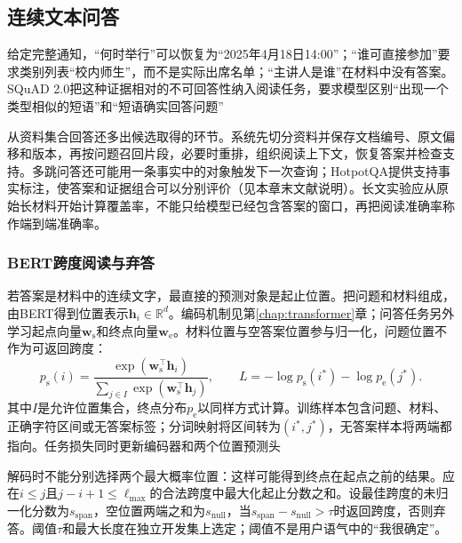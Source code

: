 \subsection{连续文本问答}
\label{sec:nlp-dialogue-text-qa}

给定完整通知，“何时举行”可以恢复为“2025年4月18日14:00”；“谁可直接参加”要求类别列表“校内师生”，而不是实际出席名单；“主讲人是谁”在材料中没有答案。SQuAD 2.0把这种证据相对的不可回答性纳入阅读任务，要求模型区别“出现一个类型相似的短语”和“短语确实回答问题”

从资料集合回答还多出候选取得的环节。系统先切分资料并保存文档编号、原文偏移和版本，再按问题召回片段，必要时重排，组织阅读上下文，恢复答案并检查支持。多跳问答还可能用一条事实中的对象触发下一次查询；HotpotQA提供支持事实标注，使答案和证据组合可以分别评价（见本章末文献说明）。长文实验应从原始长材料开始计算覆盖率，不能只给模型已经包含答案的窗口，再把阅读准确率称作端到端准确率。

\subsubsection{BERT跨度阅读与弃答}
\label{sec:nlp-dialogue-bert-span}

若答案是材料中的连续文字，最直接的预测对象是起止位置。把问题和材料组成，由BERT得到位置表示$\bm{h}_i\in\mathbb{R}^{d}$。编码机制见第\ref{chap:transformer}章；问答任务另外学习起点向量$\bm{w}_{\mathrm{s}}$和终点向量$\bm{w}_{\mathrm{e}}$。材料位置与空答案位置参与归一化，问题位置不作为可返回跨度：
\begin{equation}
  p_{\mathrm{s}}(i)=
  \frac{\exp(\bm{w}_{\mathrm{s}}^\top\bm{h}_i)}
       {\sum_{j\in I}\exp(\bm{w}_{\mathrm{s}}^\top\bm{h}_j)},
  \qquad
  L=-\log p_{\mathrm{s}}(i^*)-\log p_{\mathrm{e}}(j^*).
  \label{eq:nlp-dialogue-span}
\end{equation}
其中$I$是允许位置集合，终点分布$p_{\mathrm{e}}$以同样方式计算。训练样本包含问题、材料、正确字符区间或无答案标签；分词映射将区间转为$(i^*,j^*)$，无答案样本将两端都指向\code{[CLS]}。任务损失同时更新编码器和两个位置预测头

解码时不能分别选择两个最大概率位置：这样可能得到终点在起点之前的结果。应在$i\leq j$且$j-i+1\leq\ell_{\max}$的合法跨度中最大化起止分数之和。设最佳跨度的未归一化分数为$s_{\mathrm{span}}$，空位置两端之和为$s_{\mathrm{null}}$，当$s_{\mathrm{span}}-s_{\mathrm{null}}>\tau$时返回跨度，否则弃答。阈值$\tau$和最大长度在独立开发集上选定；阈值不是用户语气中的“我很确定”。

